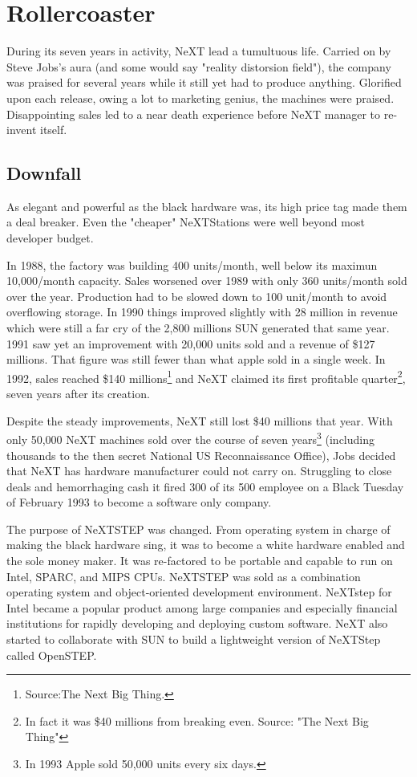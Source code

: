 \section{Rollercoaster}
During its seven years in activity, NeXT lead a tumultuous life. Carried on by Steve Jobs's aura (and some would say "reality distorsion field"), the company was praised for several years while it still yet had to produce anything. Glorified upon each release, owing a lot to marketing genius, the machines were praised. Disappointing sales led to a near death experience before NeXT manager to re-invent itself.\\
\par

\subsection{Downfall}
As elegant and powerful as the black hardware was, its high price tag made them a deal breaker. Even the "cheaper" NeXTStations were well beyond most developer budget.\\
\par
 In 1988, the factory was building 400 units/month, well below its maximun 10,000/month capacity. Sales worsened over 1989 with only 360 units/month sold over the year. Production had to be slowed down to 100 unit/month to avoid overflowing storage. In 1990 things improved slightly with 28 million in revenue which were still a far cry of the 2,800 millions SUN generated that same year. 1991 saw yet an improvement with 20,000 units sold and a revenue of \$127 millions. That figure was still fewer than what apple sold in a single week. In 1992, sales reached \$140 millions\footnote{Source:The Next Big Thing.} and NeXT claimed its first profitable quarter\footnote{In fact it was \$40 millions from breaking even. Source: "The Next Big Thing"}, seven years after its creation.\\
\par
Despite the steady improvements, NeXT still lost \$40 millions that year. With only 50,000 NeXT machines sold over the course of seven years\footnote{In 1993 Apple sold 50,000 units every six days.} (including thousands to the then secret National US Reconnaissance Office), Jobs decided that NeXT has hardware manufacturer could not carry on. Struggling to close deals and hemorrhaging cash it fired 300 of its 500 employee on a Black Tuesday of February 1993 to become a software only company.\\
\par
 The purpose of NeXTSTEP was changed. From operating system in charge of making the black hardware sing, it was to become a white hardware enabled and the sole money maker. It was re-factored to be portable and capable to run on Intel, SPARC, and MIPS CPUs. NeXTSTEP was sold as a combination operating system and object-oriented development environment. NeXTstep for Intel became a popular product among large companies and especially financial institutions for rapidly developing and deploying custom software. NeXT also started to collaborate with SUN to build a lightweight version of NeXTStep called OpenSTEP.\\
\par


